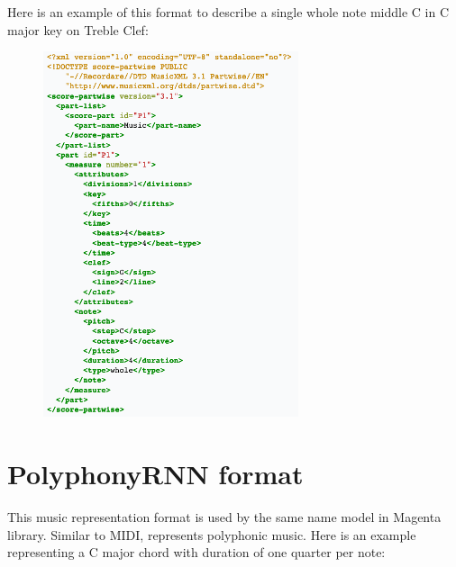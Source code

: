 Here is an example of this format to describe a single whole note middle C in C major key
on Treble Clef:

\begin{figure}[h!]
    \centering
    \includegraphics[width=\linewidth]{image/fig_JDF29.png}
\end{figure}

\section{PolyphonyRNN format}

This music representation format is used by the same name model in Magenta library.
Similar to MIDI, represents polyphonic music. Here is an example representing a C major
chord with duration of one quarter per note:

